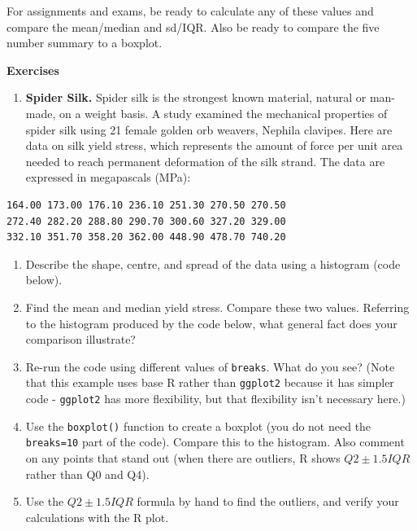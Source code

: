 \documentclass[
  letterpaper,
  DIV=11,
  numbers=noendperiod]{scrreprt}
\providecommand{\tightlist}{%
  \setlength{\itemsep}{0pt}\setlength{\parskip}{0pt}}\usepackage{longtable,booktabs,array}
\begin{document}
For assignments and exams, be ready to calculate any of these values and
compare the mean/median and sd/IQR. Also be ready to compare the five
number summary to a boxplot.

\textbf{Exercises}

\begin{enumerate}
\def\labelenumi{\arabic{enumi}.}
\tightlist
\item
  \textbf{Spider Silk.} Spider silk is the strongest known material,
  natural or man-made, on a weight basis. A study examined the
  mechanical properties of spider silk using 21 female golden orb
  weavers, Nephila clavipes. Here are data on silk yield stress, which
  represents the amount of force per unit area needed to reach permanent
  deformation of the silk strand. The data are expressed in megapascals
  (MPa):
\end{enumerate}

\begin{verbatim}
164.00 173.00 176.10 236.10 251.30 270.50 270.50
272.40 282.20 288.80 290.70 300.60 327.20 329.00
332.10 351.70 358.20 362.00 448.90 478.70 740.20
\end{verbatim}

\begin{enumerate}
\def\labelenumi{\alph{enumi}.}
\tightlist
\item
  Describe the shape, centre, and spread of the data using a histogram
  (code below).
\item
  Find the mean and median yield stress. Compare these two values.
  Referring to the histogram produced by the code below, what general
  fact does your comparison illustrate?
\item
  Re-run the code using different values of \texttt{breaks}. What do you
  see? (Note that this example uses base R rather than \texttt{ggplot2}
  because it has simpler code - \texttt{ggplot2} has more flexibility,
  but that flexibility isn't necessary here.)
\item
  Use the \texttt{boxplot()} function to create a boxplot (you do not
  need the \texttt{breaks=10} part of the code). Compare this to the
  histogram. Also comment on any points that stand out (when there are
  outliers, R shows \(Q2\pm 1.5IQR\) rather than Q0 and Q4).
\item
  Use the \(Q2\pm 1.5IQR\) formula by hand to find the outliers, and
  verify your calculations with the R plot.
\end{enumerate}
\end{document}
